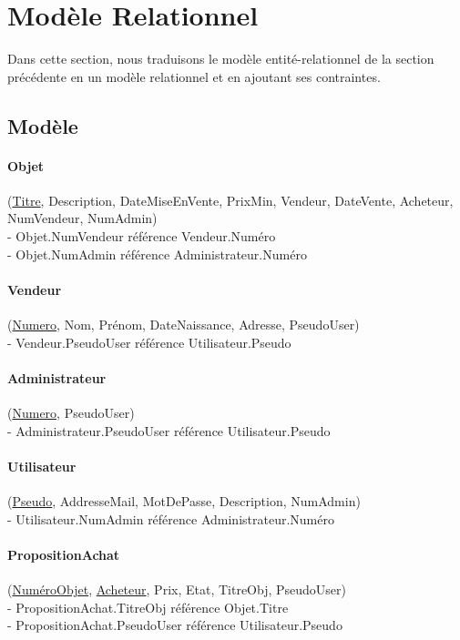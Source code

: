 \documentclass{article}
\begin{document}
\newpage 

\section{Modèle Relationnel}
Dans cette section, nous traduisons le modèle entité-relationnel de la section précédente en un modèle relationnel et en ajoutant ses contraintes.

\subsection{Modèle}

\indent

\paragraph{Objet} (\underline{Titre}, Description, DateMiseEnVente, PrixMin, Vendeur, DateVente, Acheteur, NumVendeur, NumAdmin)\\
\indent - Objet.NumVendeur référence Vendeur.Numéro\\
\indent - Objet.NumAdmin référence Administrateur.Numéro


\paragraph{Vendeur} (\underline{Numero}, Nom, Prénom, DateNaissance, Adresse, PseudoUser)\\
\indent - Vendeur.PseudoUser référence Utilisateur.Pseudo


\paragraph{Administrateur} (\underline{Numero}, PseudoUser)\\
\indent - Administrateur.PseudoUser référence Utilisateur.Pseudo


\paragraph{Utilisateur} (\underline{Pseudo}, AddresseMail, MotDePasse, 
Description, NumAdmin)\\
\indent - Utilisateur.NumAdmin référence Administrateur.Numéro


\paragraph{PropositionAchat} (\underline{NuméroObjet}, \underline{Acheteur}, Prix, Etat, TitreObj, PseudoUser)\\
\indent - PropositionAchat.TitreObj référence Objet.Titre\\
\indent - PropositionAchat.PseudoUser référence Utilisateur.Pseudo
\end{document}

